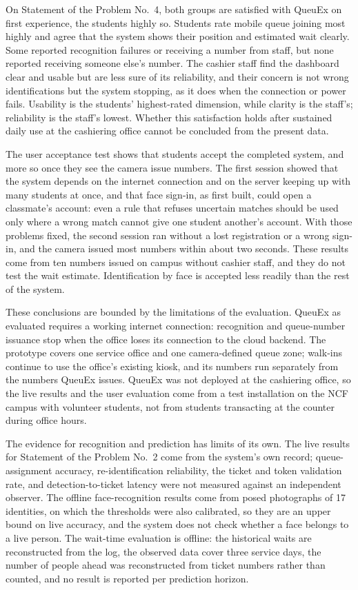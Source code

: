 \documentclass{research}
\newcommand{\sysname}{QueuEx}
\begin{document}
On Statement of the Problem No.~4, both groups are satisfied with
\sysname{} on first experience, the students highly so. Students rate
mobile queue joining most highly and agree that the system shows their
position and estimated wait clearly. Some reported recognition failures
or receiving a number from staff, but none reported receiving someone
else's number. The cashier staff find the dashboard clear and usable but
are less sure of its reliability, and their concern is not wrong
identifications but the system stopping, as it does when the connection
or power fails. Usability is the students' highest-rated dimension,
while clarity is the staff's; reliability is the staff's lowest. Whether
this satisfaction holds after sustained daily use at the cashiering
office cannot be concluded from the present data.

The user acceptance test shows that students accept the completed
system, and more so once they see the camera issue numbers. The first
session showed that the system depends on the internet connection and
on the server keeping up with many students at once, and that face
sign-in, as first built, could open a classmate's account: even a rule
that refuses uncertain matches should be used only where a wrong match
cannot give one student another's account. With those problems fixed,
the second session ran without a lost registration or a wrong sign-in,
and the camera issued most numbers within about two seconds. These
results come from ten numbers issued on campus without cashier staff,
and they do not test the wait estimate. Identification by face is
accepted less readily than the rest of the system.

\label{subsec:limitations}These conclusions are bounded by the
limitations of the evaluation. \sysname{} as evaluated requires a
working internet connection: recognition and queue-number issuance stop
when the office loses its connection to the cloud backend. The prototype
covers one service office and one camera-defined queue zone; walk-ins
continue to use the office's existing kiosk, and its numbers run
separately from the numbers \sysname{} issues. \sysname{} was not
deployed at the cashiering office, so the live results and the user
evaluation come from a test installation on the NCF campus with
volunteer students, not from students transacting at the counter during
office hours.

The evidence for recognition and prediction has limits of its own. The
live results for Statement of the Problem No.~2 come from the system's
own record; queue-assignment accuracy, re-identification reliability,
the ticket and token validation rate, and detection-to-ticket latency
were not measured against an independent observer. The offline
face-recognition results come from posed photographs of 17 identities,
on which the thresholds were also calibrated, so they are an upper bound
on live accuracy, and the system does not check whether a face belongs
to a live person. The wait-time evaluation is offline: the historical
waits are reconstructed from the log, the observed data cover three
service days, the number of people ahead was reconstructed from ticket
numbers rather than counted, and no result is reported per prediction
horizon.
\end{document}
